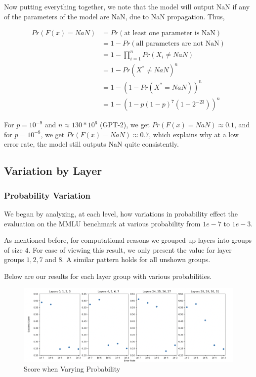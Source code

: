 Now putting everything together, we note that the model will output NaN if any of the parameters of the model are NaN, due to NaN propagation. Thus,

\begin{align*}
	Pr(F(x) = NaN) &= Pr(\text{at least one parameter is NaN}) \\
	&= 1 - Pr(\text{all parameters are not NaN}) \\
	&= 1 - \prod_{i=1}^n Pr(X_i \neq NaN) \\
	&= 1 - Pr(X^* \neq NaN)^n \\
	&= 1 - (1 - Pr(X^* = NaN))^n \\
	&= 1 - (1 - p(1 - p)^7(1 - 2^{-23}))^n
\end{align*}

For $p = 10^{-9}$ and $n \approx 130 * 10^6$ (GPT-2), we get $Pr(F(x) = NaN) \approx 0.1$, and for $p = 10^{-8}$, we get $Pr(F(x) = NaN) \approx 0.7$, which explains why at a low error rate, the model still outputs NaN quite consistently.

\subsection{Variation by Layer}

\subsubsection{Probability Variation}
We began by analyzing, at each level, how variations in probability effect the evaluation on the MMLU benchmark at various probability from $1e-7$ to $1e-3$.

As mentioned before, for computational reasons we grouped up layers into groups of size $4$. For ease of viewing this result, we only present the value for layer groups $1, 2, 7$ and $8$. A similar pattern
holds for all unshown groups.

Below are our results for each layer group with various probabilities.

\begin{figure}[!htbp]
    \centering
    \includegraphics[width=1.0\textwidth]{images/varyprob.png}
    \caption{Score when Varying Probability}
    \label{fig:varyprob}
\end{figure}

